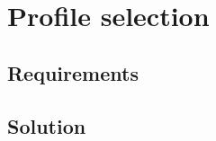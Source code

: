 \section{Profile selection}
\label{design:profile_selection}
\subsection{Requirements}
\subsection{Solution}